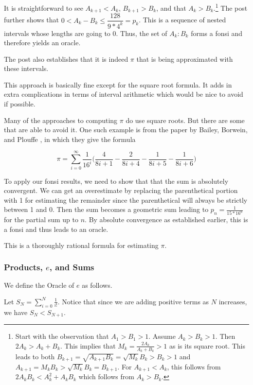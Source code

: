 \documentclass[12pt]{article}
\begin{document}
It is straightforward to see $A_{k+1} < A_k$, $B_{k+1} > B_k$, and that $A_k > B_k$.\footnote{Start with the observation that $A_1 > B_1 > 1$. Assume $A_k > B_k > 1$. Then $2 A_k  > A_k + B_k$. This implies that $M_k = \frac{2A_k}{A_k + B_k}>1$ as is its square root. This leads to both $B_{k+1} =  \sqrt{A_{k+1} B_k} = \sqrt{M_k} B_k > B_k > 1$  and $A_{k+1} = M_k B_k > \sqrt{M_k} B_k = B_{k+1}$.  For $A_{k+1} < A_k$, this follows from $2A_k B_k < A_k^2 + A_kB_k$ which follows from $A_k > B_k$.} The post further shows that $0 < A_k - B_k \leq \dfrac{128}{9*4^k} = p_k $. This is a sequence of nested intervals whose lengths are going to 0. Thus, the set of $A_k:B_k$ forms a fonsi and therefore yields an oracle. 

The post also establishes that it is indeed $\pi$ that is being approximated with these intervals.

This approach is basically fine except for the square root formula. It adds in extra complications in terms of interval arithmetic which would be nice to avoid if possible. 

Many of the approaches to computing $\pi$ do use square roots. But there are some that are able to avoid it. One such example is from the paper by Bailey, Borwein, and Plouffe \cite{BBP}, in which they give the formula 

\[ 
\pi = \sum_{i=0}^\infty \frac{1}{16^i} \bigg( \frac{4}{8i+1} - \frac{2}{8i+4} - \frac{1}{8i+5} - \frac{1}{8i+6} \bigg)
\]


To apply our fonsi results, we need to show that that the sum is absolutely convergent. We can get an overestimate by replacing the parenthetical portion with 1 for estimating the remainder since the parenthetical will always be strictly between 1 and 0. Then the sum becomes a geometric sum leading to $p_n = \frac{1}{15*16^n}$ for the partial sum up to $n$. By absolute convergence as established earlier, this is a fonsi and thus leads to an oracle.  

This is a thoroughly rational formula for estimating $\pi$.

\subsubsection{Products, \texorpdfstring{$e$}{e}, and Sums}\label{sec:e}

We define the Oracle of $e$ as follows. 

Let $S_N = \sum_{i=0}^N \frac{1}{i!}$. Notice that since we are adding positive terms as $N$ increases, we have $S_N < S_{N+1}$. 
\end{document}
